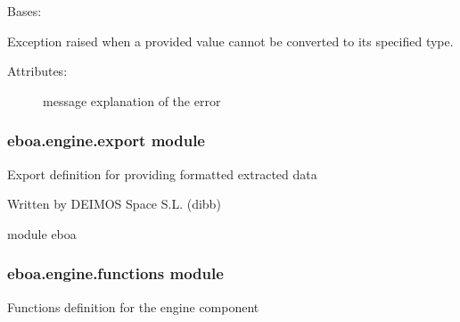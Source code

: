
\begin{fulllineitems}
\label{\detokenize{eboa.engine:eboa.engine.errors.WrongValue}}
Bases: {\hyperref[\detokenize{eboa.engine:eboa.engine.errors.Error}]{}}

Exception raised when a provided value cannot be converted to its specified type.
\begin{description}
\item[{Attributes:}] \leavevmode
message \textendash{} explanation of the error

\end{description}

\end{fulllineitems}



\subsubsection{eboa.engine.export module}
\label{\detokenize{eboa.engine:module-eboa.engine.export}}\label{\detokenize{eboa.engine:eboa-engine-export-module}}
Export definition for providing formatted extracted data

Written by DEIMOS Space S.L. (dibb)

module eboa

\begin{fulllineitems}
\label{\detokenize{eboa.engine:eboa.engine.export.build_values_structure}}
\end{fulllineitems}



\subsubsection{eboa.engine.functions module}
\label{\detokenize{eboa.engine:module-eboa.engine.functions}}\label{\detokenize{eboa.engine:eboa-engine-functions-module}}
Functions definition for the engine component

